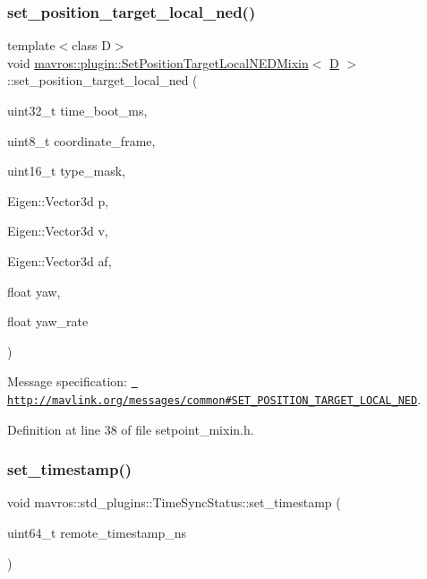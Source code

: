 \subsubsection{\texorpdfstring{set\_position\_target\_local\_ned()}{set\_position\_target\_local\_ned()}}
{\footnotesize\ttfamily template$<$class D$>$ \\
void \mbox{\hyperlink{classmavros_1_1plugin_1_1SetPositionTargetLocalNEDMixin}{mavros\+::plugin\+::\+Set\+Position\+Target\+Local\+N\+E\+D\+Mixin}}$<$ \mbox{\hyperlink{mavlink__sha256_8h_af316c33cc298530f245e8b55330e86b5}{D}} $>$\+::set\+\_\+position\+\_\+target\+\_\+local\+\_\+ned (\begin{DoxyParamCaption}\item[{uint32\+\_\+t}]{time\+\_\+boot\+\_\+ms,  }\item[{uint8\+\_\+t}]{coordinate\+\_\+frame,  }\item[{uint16\+\_\+t}]{type\+\_\+mask,  }\item[{Eigen\+::\+Vector3d}]{p,  }\item[{Eigen\+::\+Vector3d}]{v,  }\item[{Eigen\+::\+Vector3d}]{af,  }\item[{float}]{yaw,  }\item[{float}]{yaw\+\_\+rate }\end{DoxyParamCaption})\hspace{0.3cm}{\ttfamily [inline]}}



Message specification\+: {\ttfamily \href{http://mavlink.org/messages/common\#SET_POSITION_TARGET_LOCAL_NED}{\texttt{ http\+://mavlink.\+org/messages/common\#\+S\+E\+T\+\_\+\+P\+O\+S\+I\+T\+I\+O\+N\+\_\+\+T\+A\+R\+G\+E\+T\+\_\+\+L\+O\+C\+A\+L\+\_\+\+N\+ED}}}. 



Definition at line 38 of file setpoint\+\_\+mixin.\+h.

\mbox{\label{group__plugin_gafb645e825e6162348a94b8e62d6cc9cd}} 
\subsubsection{\texorpdfstring{set\_timestamp()}{set\_timestamp()}}
{\footnotesize\ttfamily void mavros\+::std\+\_\+plugins\+::\+Time\+Sync\+Status\+::set\+\_\+timestamp (\begin{DoxyParamCaption}\item[{uint64\+\_\+t}]{remote\+\_\+timestamp\+\_\+ns }\end{DoxyParamCaption})\hspace{0.3cm}{\ttfamily [inline]}}



